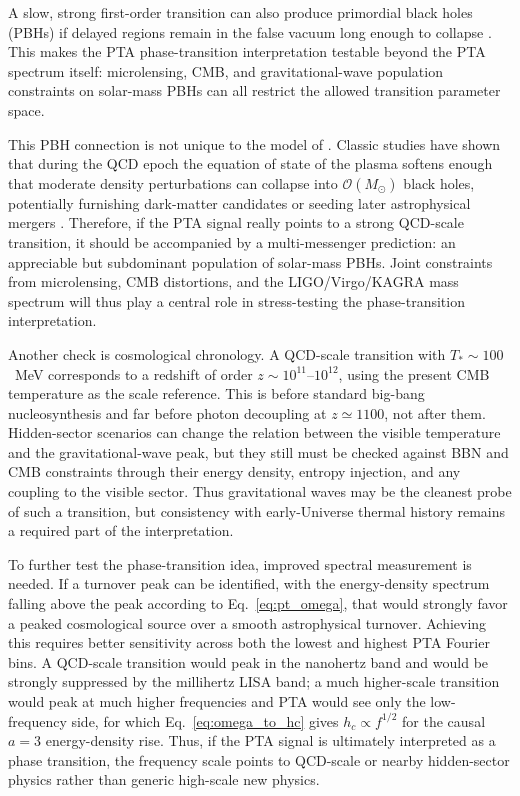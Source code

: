 \documentclass[symmetry,article,submit,pdftex,moreauthors]{Definitions/mdpi}
\begin{document}
A slow, strong first-order transition can also produce primordial black holes (PBHs) if delayed regions remain in the false vacuum long enough to collapse \cite{Gouttenoire2023}. This makes the PTA phase-transition interpretation testable beyond the PTA spectrum itself: microlensing, CMB, and gravitational-wave population constraints on solar-mass PBHs can all restrict the allowed transition parameter space.

This PBH connection is not unique to the model of \cite{Gouttenoire2023}. Classic studies have shown that during the QCD epoch the equation of state of the plasma softens enough that moderate density perturbations can collapse into $\mathcal{O}(M_\odot)$ black holes, potentially furnishing dark-matter candidates or seeding later astrophysical mergers \cite{Carr2020}. Therefore, if the PTA signal really points to a strong QCD-scale transition, it should be accompanied by a multi-messenger prediction: an appreciable but subdominant population of solar-mass PBHs. Joint constraints from microlensing, CMB distortions, and the LIGO/Virgo/KAGRA mass spectrum will thus play a central role in stress-testing the phase-transition interpretation.

Another check is cosmological chronology. A QCD-scale transition with $T_*\sim100$~MeV corresponds to a redshift of order $z\sim10^{11}$--$10^{12}$, using the present CMB temperature as the scale reference. This is before standard big-bang nucleosynthesis and far before photon decoupling at $z\simeq1100$, not after them. Hidden-sector scenarios can change the relation between the visible temperature and the gravitational-wave peak, but they still must be checked against BBN and CMB constraints through their energy density, entropy injection, and any coupling to the visible sector. Thus gravitational waves may be the cleanest probe of such a transition, but consistency with early-Universe thermal history remains a required part of the interpretation.

To further test the phase-transition idea, improved spectral measurement is needed. If a turnover peak can be identified, with the energy-density spectrum falling above the peak according to Eq.~\eqref{eq:pt_omega}, that would strongly favor a peaked cosmological source over a smooth astrophysical turnover. Achieving this requires better sensitivity across both the lowest and highest PTA Fourier bins. A QCD-scale transition would peak in the nanohertz band and would be strongly suppressed by the millihertz LISA band; a much higher-scale transition would peak at much higher frequencies and PTA would see only the low-frequency side, for which Eq.~\eqref{eq:omega_to_hc} gives $h_c\propto f^{1/2}$ for the causal $a=3$ energy-density rise. Thus, if the PTA signal is ultimately interpreted as a phase transition, the frequency scale points to QCD-scale or nearby hidden-sector physics rather than generic high-scale new physics.
\end{document}
